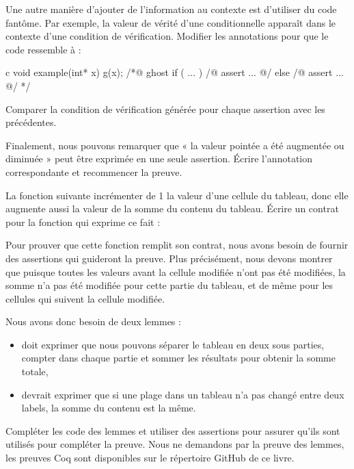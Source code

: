 Une autre manière d'ajouter de l'information au contexte est d'utiliser du
code fantôme. Par exemple, la valeur de vérité d'une conditionnelle apparaît
dans le contexte d'une condition de vérification. Modifier les annotations pour
que le code ressemble à :


\begin{CodeBlock}{c}
void example(int* x){
  g(x);
  /*@ ghost
   if ( ... ){
    /@ assert ... @/
   } else {
    /@ assert ... @/
   }
  */
}
\end{CodeBlock}

Comparer la condition de vérification générée pour chaque assertion avec les
précédentes.


Finalement, nous pouvons remarquer que « la valeur pointée a été augmentée ou
diminuée » peut être exprimée en une seule assertion. Écrire l'annotation
correspondante et recommencer la preuve.


\label{l4:proof-methodologies-triggering-lemmas-exercises-sum}


La fonction suivante incrémenter de 1 la valeur d'une cellule du tableau, donc
elle augmente aussi la valeur de la somme du contenu du tableau. Écrire un contrat
pour la fonction qui exprime ce fait :




Pour prouver que cette fonction remplit son contrat, nous avons besoin de fournir
des assertions qui guideront la preuve. Plus précisément, nous devons montrer que
puisque toutes les valeurs avant la cellule modifiée n'ont pas été modifiées, la
somme n'a pas été modifiée pour cette partie du tableau, et de même pour les
cellules qui suivent la cellule modifiée.


Nous avons donc besoin de deux lemmes :
\begin{itemize}
    \item {} doit exprimer que nous pouvons séparer le
          tableau en deux sous parties, compter dans chaque partie et sommer les
          résultats pour obtenir la somme totale,
    \item {} devrait exprimer que si une plage dans un
          tableau n'a pas changé entre deux labels, la somme du contenu est la
          même.
\end{itemize}


Compléter les code des lemmes et utiliser des assertions pour assurer qu'ils sont
utilisés pour compléter la preuve. Nous ne demandons par la preuve des lemmes, les
preuves Coq sont disponibles sur le répertoire GitHub de ce livre.
